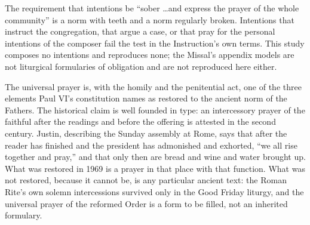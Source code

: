 The requirement that intentions be ``sober \ldots and express the prayer of the whole
community'' is a norm with teeth and a norm regularly broken. Intentions that instruct the
congregation, that argue a case, or that pray for the personal intentions of the composer fail
the test in the Instruction's own terms. This study composes no intentions and reproduces none;
the Missal's appendix models are not liturgical formularies of obligation and are not
reproduced here either.

The universal prayer is, with the homily and the penitential act, one of the three elements
Paul VI's constitution names as restored to the ancient norm of the Fathers. The historical
claim is well founded in type: an intercessory prayer of the faithful after the readings and
before the offering is attested in the second century. Justin, describing the Sunday assembly
at Rome, says that after the reader has finished and the president has admonished and exhorted,
``we all rise together and pray,'' and that only then are bread and wine and water brought
up. What was restored in 1969 is a prayer in that place with
that function. What was not restored, because it cannot be, is any particular ancient text: the
Roman Rite's own solemn intercessions survived only in the Good Friday liturgy, and the
universal prayer of the reformed Order is a form to be filled, not an inherited formulary.
